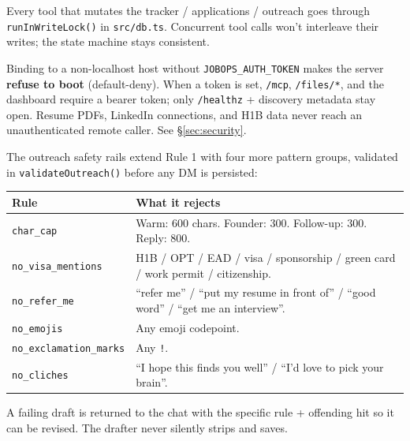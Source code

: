 \documentclass[11pt,letterpaper]{article}
\newcommand{\tool}[1]{\texttt{#1}}
\newcommand{\fpath}[1]{\texttt{#1}}
\begin{document}
\begin{warnbox}
Every tool that mutates the tracker / applications / outreach goes through \texttt{runInWriteLock()} in \fpath{src/db.ts}. Concurrent tool calls won't interleave their writes; the state machine stays consistent.
\end{warnbox}

\begin{warnbox}
Binding to a non-localhost host without \texttt{JOBOPS\_AUTH\_TOKEN} makes the server \textbf{refuse to boot} (default-deny). When a token is set, \texttt{/mcp}, \texttt{/files/*}, and the dashboard require a bearer token; only \texttt{/healthz} + discovery metadata stay open. Resume PDFs, LinkedIn connections, and H1B data never reach an unauthenticated remote caller. See \S\ref{sec:security}.
\end{warnbox}

\medskip

The outreach safety rails extend Rule 1 with four more pattern groups, validated in \tool{validateOutreach()} before any DM is persisted:

\begin{center}
\small
\begin{tabularx}{\linewidth}{l X}
\toprule
\rowcolor{accent!10}\textbf{Rule} & \textbf{What it rejects} \\
\midrule
\texttt{char\_cap}            & Warm: 600 chars. Founder: 300. Follow-up: 300. Reply: 800. \\
\texttt{no\_visa\_mentions}   & H1B / OPT / EAD / visa / sponsorship / green card / work permit / citizenship. \\
\texttt{no\_refer\_me}        & ``refer me'' / ``put my resume in front of'' / ``good word'' / ``get me an interview''. \\
\texttt{no\_emojis}           & Any emoji codepoint. \\
\texttt{no\_exclamation\_marks} & Any \texttt{!}. \\
\texttt{no\_cliches}          & ``I hope this finds you well'' / ``I'd love to pick your brain''. \\
\bottomrule
\end{tabularx}
\end{center}

A failing draft is returned to the chat with the specific rule + offending hit so it can be revised. The drafter never silently strips and saves.
\end{document}

